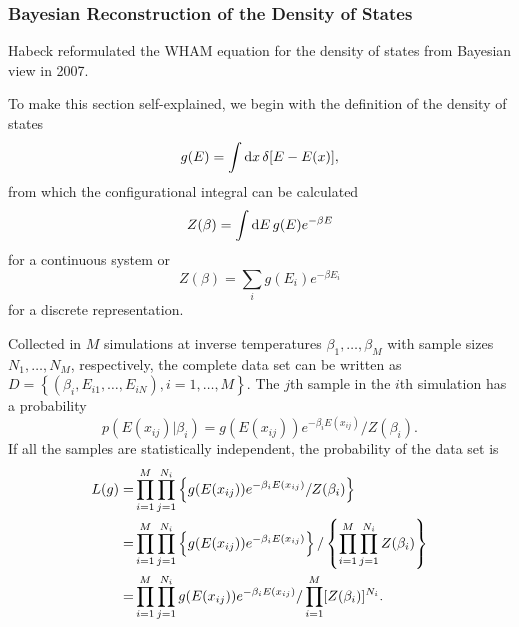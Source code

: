\subsubsection{Bayesian Reconstruction of the Density of States\label{Sec:FEM:WHAM_Bayes}}
Habeck reformulated the WHAM equation for the density of states from Bayesian view in 2007.\cite{HabeckPRL2007}

To make this section self-explained, we begin with the definition of the density of states
\begin{equation}
    g(E)=\int\mathop{}\!\mathrm{d} x\,\delta[E-E(x)],
\end{equation}
from which the configurational integral can be calculated
\begin{equation}
    Z(\beta)=\int\mathop{}\!\mathrm{d} E\,g(E)e^{-\beta E}
\end{equation}
for a continuous system or
\begin{equation}
    Z(\beta)=\sum_i g(E_i)e^{-\beta E_i}
\end{equation}
for a discrete representation. 

Collected in $M$ simulations at inverse temperatures $\beta_1,\dots,\beta_M$ with sample sizes $N_1,\dots,N_M$, respectively, the complete data set can be written as $D=\left\{\left(\beta_i,E_{i1},\dots,E_{iN}\right),i=1,\dots,M\right\}$. The $j$th sample in the $i$th simulation has a probability
\begin{equation}
    p(E(x_{ij})|\beta_i)=g(E(x_{ij}))e^{-\beta_{i}E(x_{ij})}/Z(\beta_i).
\end{equation}
If all the samples are statistically independent, the probability of the data set is
\begin{align}
    L(g)=&\prod_{i=1}^{M}\prod_{j=1}^{N_i}\left\{g(E(x_{ij}))e^{-\beta_{i}E(x_{ij})}/Z(\beta_i)\right\}\notag\\
        =&\prod_{i=1}^{M}\prod_{j=1}^{N_i}\left\{g(E(x_{ij}))e^{-\beta_{i}E(x_{ij})}\right\}/\left\{\prod_{i=1}^{M}\prod_{j=1}^{N_i}Z(\beta_i)\right\}\notag\\
        =&\prod_{i=1}^{M}\prod_{j=1}^{N_i}g(E(x_{ij}))e^{-\beta_{i}E(x_{ij})}/\prod_{i=1}^{M}[Z(\beta_i)]^{N_i}.
\end{align}

